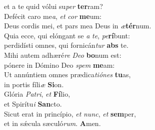 \evenverse et a te quid vólui su\textit{per} \textbf{ter}ram?\\
\oddverse Defécit caro me\textit{a}, \textit{et} \textit{cor} \textbf{me}um:~\*\\
\oddverse Deus cordis mei, et pars mea Deus in \textit{æ}\textbf{tér}num.\\
\evenverse Quia ecce, qui elóngant se \textit{a} \textit{te}, \textit{pe}\textbf{rí}bunt:~\*\\
\evenverse perdidísti omnes, qui fornicán\textit{tur} \textbf{abs} te.\\
\oddverse Mihi autem adhæré\textit{re} \textit{De}\textit{o} \textbf{bo}num est:~\*\\
\oddverse pónere in Dómino Deo \textit{spem} \textbf{me}am:\\
\evenverse Ut annúntiem omnes prædica\textit{ti}\textit{ó}\textit{nes} \textbf{tu}as,~\*\\
\evenverse in portis fíli\textit{æ} \textbf{Si}on.\\
\oddverse Glória \textit{Pa}\textit{tri}, \textit{et} \textbf{Fí}lio,~\*\\
\oddverse et Spirítu\textit{i} \textbf{San}cto.\\
\evenverse Sicut erat in princípio, \textit{et} \textit{nunc}, \textit{et} \textbf{sem}per,~\*\\
\evenverse et in sǽcula sæculó\textit{rum}. \textbf{A}men.\\
